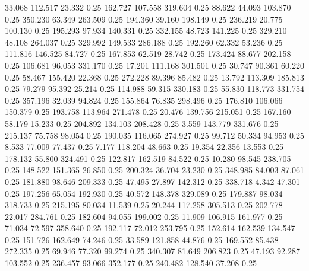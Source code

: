   33.068  112.517   23.332         0.25
 162.727  107.558  319.604         0.25
  88.622   44.093  103.870         0.25
 350.230   63.349  263.509         0.25
 194.360   39.160  198.149         0.25
 236.219   20.775  100.130         0.25
 195.293   97.934  140.331         0.25
 332.155   48.723  141.225         0.25
 329.210   48.108  264.037         0.25
 329.992  149.533  286.188         0.25
 192.260   62.332   53.236         0.25
 111.816  146.525   84.727         0.25
 167.853   62.519   28.742         0.25
 173.424   88.677  202.158         0.25
 106.681   96.053  331.170         0.25
  17.201  111.168  301.501         0.25
  30.747   90.361   60.220         0.25
  58.467  155.420   22.368         0.25
 272.228   89.396   85.482         0.25
  13.792  113.309  185.813         0.25
  79.279   95.392   25.214         0.25
 114.988   59.315  330.183         0.25
  55.830  118.773  331.754         0.25
 357.196   32.039   94.824         0.25
 155.864   76.835  298.496         0.25
 176.810  106.066  150.379         0.25
 193.758  113.964  271.478         0.25
  20.476  139.756  215.051         0.25
 167.160   58.179   15.233         0.25
 204.892  134.103  208.428         0.25
   3.559  143.779  331.676         0.25
 215.137   75.758   98.054         0.25
 190.035  116.065  274.927         0.25
  99.712   50.334   94.953         0.25
   8.533   77.009   77.437         0.25
   7.177  118.204   48.663         0.25
  19.354   22.356   13.553         0.25
 178.132   55.800  324.491         0.25
 122.817  162.519   84.522         0.25
  10.280   98.545  238.705         0.25
 148.522  151.365   26.850         0.25
 200.324   36.704   23.230         0.25
 348.985   84.003   87.061         0.25
 181.880   98.646  209.333         0.25
  47.495   27.897  142.312         0.25
 338.718    4.342   47.301         0.25
 197.256   65.054  192.930         0.25
  40.572  148.378  329.089         0.25
 179.887   98.034  318.733         0.25
 215.195   80.034   11.539         0.25
  20.244  117.258  305.513         0.25
 202.778   22.017  284.761         0.25
 182.604   94.055  199.002         0.25
  11.909  106.915  161.977         0.25
  71.034   72.597  358.640         0.25
 192.117   72.012  253.795         0.25
 152.614  162.539  134.547         0.25
 151.726  162.649   74.246         0.25
  33.589  121.858   44.876         0.25
 169.552   85.438  272.335         0.25
  69.946   77.320   99.274         0.25
 340.307   81.649  206.823         0.25
  47.193   92.287  103.552         0.25
 236.457   93.066  352.177         0.25
 240.482  128.540   37.208         0.25
